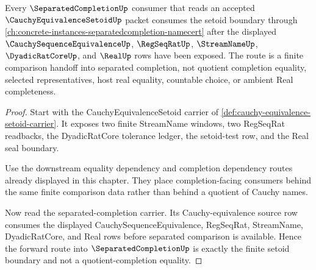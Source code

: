 \begin{theorem}
\label{thm:cauchy-equivalence-setoid-separated-completion-forward-route}
Every $\SeparatedCompletionUp$ consumer that reads an accepted $\CauchyEquivalenceSetoidUp$ packet consumes the setoid boundary through \autoref{ch:concrete-instances-separatedcompletion-namecert} after the displayed $\CauchySequenceEquivalenceUp$, $\RegSeqRatUp$, $\StreamNameUp$, $\DyadicRatCoreUp$, and $\RealUp$ rows have been exposed. The route is a finite comparison handoff into separated completion, not quotient completion equality, selected representatives, host real equality, countable choice, or ambient Real completeness.
\end{theorem}
\begin{proof}
Start with the CauchyEquivalenceSetoid carrier of \autoref{def:cauchy-equivalence-setoid-carrier}. It exposes two finite StreamName windows, two RegSeqRat readbacks, the DyadicRatCore tolerance ledger, the setoid-test row, and the Real seal boundary.

Use the downstream equality dependency and completion dependency routes already displayed in this chapter. They place completion-facing consumers behind the same finite comparison data rather than behind a quotient of Cauchy names.

Now read the separated-completion carrier. Its Cauchy-equivalence source row consumes the displayed CauchySequenceEquivalence, RegSeqRat, StreamName, DyadicRatCore, and Real rows before separated comparison is available. Hence the forward route into $\SeparatedCompletionUp$ is exactly the finite setoid boundary and not a quotient-completion equality.
\end{proof}
